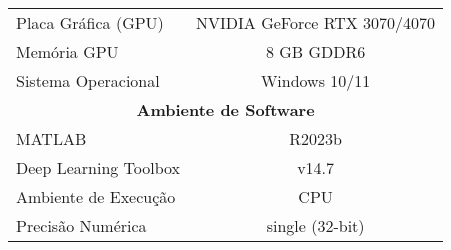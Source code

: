 \begin{table}[htbp]
\begin{tabular}{|l|c|c|}
Placa Gráfica (GPU) & \multicolumn{2}{c|}{NVIDIA GeForce RTX 3070/4070} \\
Memória GPU & \multicolumn{2}{c|}{8 GB GDDR6} \\
Sistema Operacional & \multicolumn{2}{c|}{Windows 10/11} \\
\hline
\multicolumn{3}{|c|}{\textbf{Ambiente de Software}} \\
\hline
MATLAB & \multicolumn{2}{c|}{R2023b} \\
Deep Learning Toolbox & \multicolumn{2}{c|}{v14.7} \\
Ambiente de Execução & \multicolumn{2}{c|}{CPU} \\
Precisão Numérica & \multicolumn{2}{c|}{single (32-bit)} \\
\hline
\end{tabular}
\end{table}
